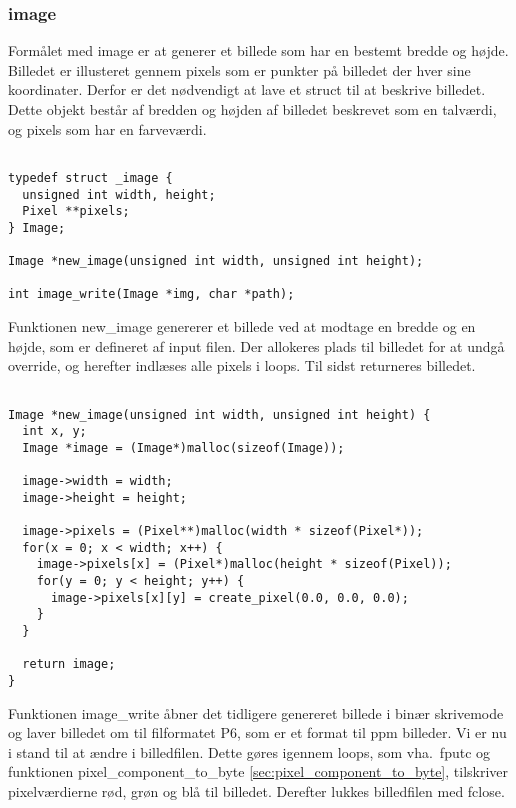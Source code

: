 \subsubsection{image}
Formålet med image er at generer et billede som har en bestemt bredde og højde. Billedet er illusteret gennem pixels som er punkter på billedet der hver sine koordinater. Derfor er det nødvendigt at lave et struct til at beskrive billedet. Dette objekt består af bredden og højden af billedet beskrevet som en talværdi, og pixels som har en farveværdi.

\begin{lstlisting}[style=Cstyle, caption=light struct]

typedef struct _image {
  unsigned int width, height;
  Pixel **pixels;
} Image;

Image *new_image(unsigned int width, unsigned int height);

int image_write(Image *img, char *path);

\end{lstlisting}

Funktionen new\_image genererer et billede ved at modtage en bredde og en højde, som er defineret af input filen. Der allokeres plads til billedet for at undgå override, og herefter indlæses alle pixels i loops. Til sidst returneres billedet.

\begin{lstlisting}[style=Cstyle, caption=light struct]

Image *new_image(unsigned int width, unsigned int height) {
  int x, y;
  Image *image = (Image*)malloc(sizeof(Image));
  
  image->width = width;
  image->height = height;

  image->pixels = (Pixel**)malloc(width * sizeof(Pixel*));
  for(x = 0; x < width; x++) {
    image->pixels[x] = (Pixel*)malloc(height * sizeof(Pixel));
    for(y = 0; y < height; y++) {
      image->pixels[x][y] = create_pixel(0.0, 0.0, 0.0);
    }
  }

  return image;
}
\end{lstlisting}

Funktionen image\_write åbner det tidligere genereret billede i binær skrivemode og laver billedet om til filformatet P6, som er et format til ppm billeder. Vi er nu i stand til at ændre i billedfilen. Dette gøres igennem loops, som vha.\ fputc og funktionen pixel\_component\_to\_byte \ref{sec:pixel_component_to_byte}, tilskriver pixelværdierne rød, grøn og blå til billedet. Derefter lukkes billedfilen med fclose.  

